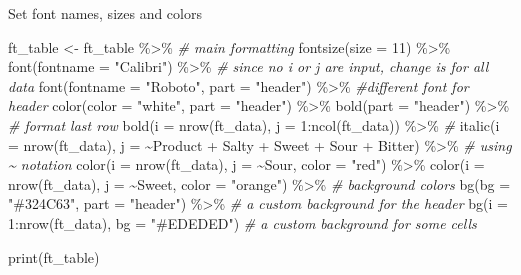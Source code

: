 \documentclass[
]{book}
\newenvironment{Shaded}{\begin{snugshade}}{\end{snugshade}}
\newcommand{\AttributeTok}[1]{\textcolor[rgb]{0.77,0.63,0.00}{#1}}
\newcommand{\CommentTok}[1]{\textcolor[rgb]{0.56,0.35,0.01}{\textit{#1}}}
\newcommand{\DecValTok}[1]{\textcolor[rgb]{0.00,0.00,0.81}{#1}}
\newcommand{\FunctionTok}[1]{\textcolor[rgb]{0.00,0.00,0.00}{#1}}
\newcommand{\NormalTok}[1]{#1}
\newcommand{\OtherTok}[1]{\textcolor[rgb]{0.56,0.35,0.01}{#1}}
\newcommand{\SpecialCharTok}[1]{\textcolor[rgb]{0.00,0.00,0.00}{#1}}
\newcommand{\StringTok}[1]{\textcolor[rgb]{0.31,0.60,0.02}{#1}}
\begin{document}
Set font names, sizes and colors

\begin{Shaded}
\begin{Highlighting}[]
\NormalTok{ft\_table }\OtherTok{\textless{}{-}}\NormalTok{ ft\_table }\SpecialCharTok{\%\textgreater{}\%} 
  \CommentTok{\# main formatting}
  \FunctionTok{fontsize}\NormalTok{(}\AttributeTok{size =} \DecValTok{11}\NormalTok{) }\SpecialCharTok{\%\textgreater{}\%}
  \FunctionTok{font}\NormalTok{(}\AttributeTok{fontname =} \StringTok{"Calibri"}\NormalTok{) }\SpecialCharTok{\%\textgreater{}\%} \CommentTok{\# since no i or j are input, change is for all data}
  \FunctionTok{font}\NormalTok{(}\AttributeTok{fontname =} \StringTok{"Roboto"}\NormalTok{, }\AttributeTok{part =} \StringTok{"header"}\NormalTok{) }\SpecialCharTok{\%\textgreater{}\%} \CommentTok{\#different font for header}
  \FunctionTok{color}\NormalTok{(}\AttributeTok{color =} \StringTok{"white"}\NormalTok{, }\AttributeTok{part =} \StringTok{"header"}\NormalTok{) }\SpecialCharTok{\%\textgreater{}\%}
  \FunctionTok{bold}\NormalTok{(}\AttributeTok{part =} \StringTok{"header"}\NormalTok{) }\SpecialCharTok{\%\textgreater{}\%}
  \CommentTok{\# format last row}
  \FunctionTok{bold}\NormalTok{(}\AttributeTok{i =} \FunctionTok{nrow}\NormalTok{(ft\_data), }\AttributeTok{j =} \DecValTok{1}\SpecialCharTok{:}\FunctionTok{ncol}\NormalTok{(ft\_data)) }\SpecialCharTok{\%\textgreater{}\%} \CommentTok{\#}
  \FunctionTok{italic}\NormalTok{(}\AttributeTok{i =} \FunctionTok{nrow}\NormalTok{(ft\_data), }\AttributeTok{j =} \SpecialCharTok{\textasciitilde{}}\NormalTok{Product }\SpecialCharTok{+}\NormalTok{ Salty }\SpecialCharTok{+}\NormalTok{ Sweet }\SpecialCharTok{+}\NormalTok{ Sour }\SpecialCharTok{+}\NormalTok{ Bitter) }\SpecialCharTok{\%\textgreater{}\%} \CommentTok{\# using \textasciitilde{} notation}
  \FunctionTok{color}\NormalTok{(}\AttributeTok{i =}  \FunctionTok{nrow}\NormalTok{(ft\_data), }\AttributeTok{j =} \SpecialCharTok{\textasciitilde{}}\NormalTok{Sour, }\AttributeTok{color =} \StringTok{"red"}\NormalTok{) }\SpecialCharTok{\%\textgreater{}\%}
  \FunctionTok{color}\NormalTok{(}\AttributeTok{i =}  \FunctionTok{nrow}\NormalTok{(ft\_data), }\AttributeTok{j =} \SpecialCharTok{\textasciitilde{}}\NormalTok{Sweet, }\AttributeTok{color =} \StringTok{"orange"}\NormalTok{) }\SpecialCharTok{\%\textgreater{}\%}
  \CommentTok{\# background colors}
  \FunctionTok{bg}\NormalTok{(}\AttributeTok{bg =} \StringTok{"\#324C63"}\NormalTok{, }\AttributeTok{part =} \StringTok{"header"}\NormalTok{) }\SpecialCharTok{\%\textgreater{}\%} \CommentTok{\# a custom background for the header}
  \FunctionTok{bg}\NormalTok{(}\AttributeTok{i =} \DecValTok{1}\SpecialCharTok{:}\FunctionTok{nrow}\NormalTok{(ft\_data), }\AttributeTok{bg =} \StringTok{"\#EDEDED"}\NormalTok{) }\CommentTok{\# a custom background for some cells}

\FunctionTok{print}\NormalTok{(ft\_table)}
\end{Highlighting}
\end{Shaded}
\end{document}

